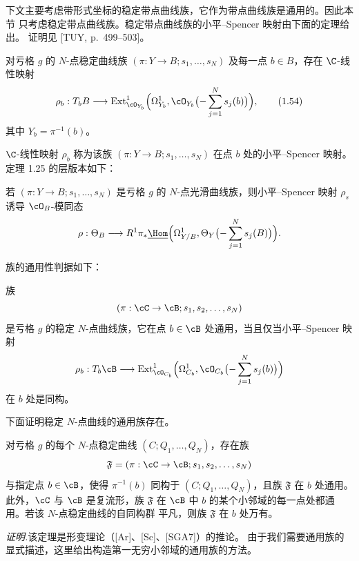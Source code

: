 下文主要考虑带形式坐标的稳定带点曲线族，它作为带点曲线族是通用的。因此本节
只考虑稳定带点曲线族。稳定带点曲线族的小平–Spencer 映射由下面的定理给出。
证明见 [TUY, p.\ 499–503]。

\begin{theorem}[1.25]
对亏格 $g$ 的 $N$-点稳定曲线族 $(\pi:Y\to B;s_1,\dots,s_N)$ 及每一点
$b\in B$，存在 $\C$-线性映射
\begin{equation}
\rho_b:T_bB\longrightarrow\operatorname{Ext}^1_{\cO_{Y_b}}
\Bigl(\Omega^1_{Y_b},\cO_{Y_b}\bigl(-\sum_{j=1}^N s_j(b)\bigr)\Bigr),
\tag{1.54}
\end{equation}
其中 $Y_b=\pi^{-1}(b)$。
\end{theorem}

$\C$-线性映射 $\rho_b$ 称为该族 $(\pi:Y\to B;s_1,\dots,s_N)$ 在点 $b$ 处的小平–Spencer
映射。定理 1.25 的层版本如下：

\begin{corollary}[1.26]
若 $(\pi:Y\to B;s_1,\dots,s_N)$ 是亏格 $g$ 的 $N$-点光滑曲线族，则小平–Spencer
映射 $\rho_s$ 诱导 $\cO_B$-模同态
\[
\rho:\Theta_B\longrightarrow R^1\pi_*\underline{\Hom}
\Bigl(\Omega^1_{Y/B},\Theta_Y\bigl(-\sum_{j=1}^N s_j(B)\bigr)\Bigr).
\]
\end{corollary}

族的通用性判据如下：

\begin{proposition}[1.27]
族
\[
(\pi:\cC\to\cB;s_1,s_2,\dots,s_N)
\]
是亏格 $g$ 的稳定 $N$-点曲线族，它在点 $b\in\cB$ 处通用，当且仅当小平–Spencer
映射
\[
\rho_b:T_b\cB\longrightarrow\operatorname{Ext}^1_{\cO_{C_b}}
\Bigl(\Omega^1_{C_b},\cO_{C_b}\bigl(-\sum_{j=1}^N s_j(b)\bigr)\Bigr)
\]
在 $b$ 处是同构。
\end{proposition}

下面证明稳定 $N$-点曲线的通用族存在。

\begin{theorem}[1.28]
对亏格 $g$ 的每个 $N$-点稳定曲线 $(C;Q_1,\dots,Q_N)$，存在族
\[
\mathfrak{F}=(\pi:\cC\to\cB;s_1,s_2,\dots,s_N)
\]
与指定点 $b\in\cB$，使得 $\pi^{-1}(b)$ 同构于 $(C;Q_1,\dots,Q_N)$，且族
$\mathfrak{F}$ 在 $b$ 处通用。此外，$\cC$ 与 $\cB$ 是复流形，族 $\mathfrak{F}$
在 $\cB$ 中 $b$ 的某个小邻域的每一点处都通用。若该 $N$-点稳定曲线的自同构群
平凡，则族 $\mathfrak{F}$ 在 $b$ 处万有。
\end{theorem}

\noindent\textit{证明.}\quad 该定理是形变理论（[Ar]、[Sc]、[SGA7]）的推论。
由于我们需要通用族的显式描述，这里给出构造第一无穷小邻域的通用族的方法。

